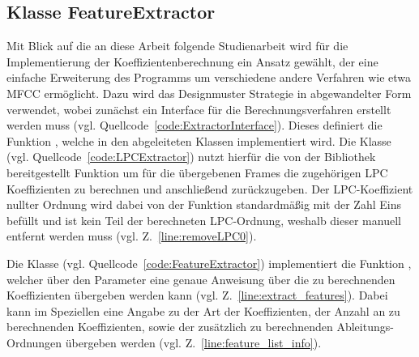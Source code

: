 \subsection{Klasse FeatureExtractor}
Mit Blick auf die an diese Arbeit folgende Studienarbeit wird für die Implementierung der Koeffizientenberechnung ein Ansatz gewählt, der eine einfache Erweiterung des Programms um verschiedene andere Verfahren wie etwa \ac{MFCC} ermöglicht.
Dazu wird das Designmuster Strategie in abgewandelter Form verwendet, wobei zunächst ein Interface für die Berechnungsverfahren erstellt werden muss (vgl. Quellcode~\ref{code:ExtractorInterface}).
Dieses definiert die Funktion , welche in den abgeleiteten Klassen implementiert wird.
Die Klasse  (vgl. Quellcode~\ref{code:LPCExtractor}) nutzt hierfür die von der Bibliothek  bereitgestellt Funktion  um für die übergebenen Frames die zugehörigen \ac{LPC} Koeffizienten zu berechnen und anschließend zurückzugeben.
Der \ac{LPC}-Koeffizient nullter Ordnung wird dabei von der Funktion standardmäßig mit der Zahl Eins befüllt und ist kein Teil der berechneten \ac{LPC}-Ordnung, weshalb dieser manuell entfernt werden muss (vgl. Z.~\ref{line:removeLPC0}).

Die Klasse  (vgl. Quellcode~\ref{code:FeatureExtractor}) implementiert die Funktion , welcher über den Parameter  eine genaue Anweisung über die zu berechnenden Koeffizienten übergeben werden kann (vgl. Z.~\ref{line:extract_features}).
Dabei kann im Speziellen eine Angabe zu der Art der Koeffizienten, der Anzahl an zu berechnenden Koeffizienten, sowie der zusätzlich zu berechnenden Ableitungs-Ordnungen übergeben werden (vgl. Z.~\ref{line:feature_list_info}).